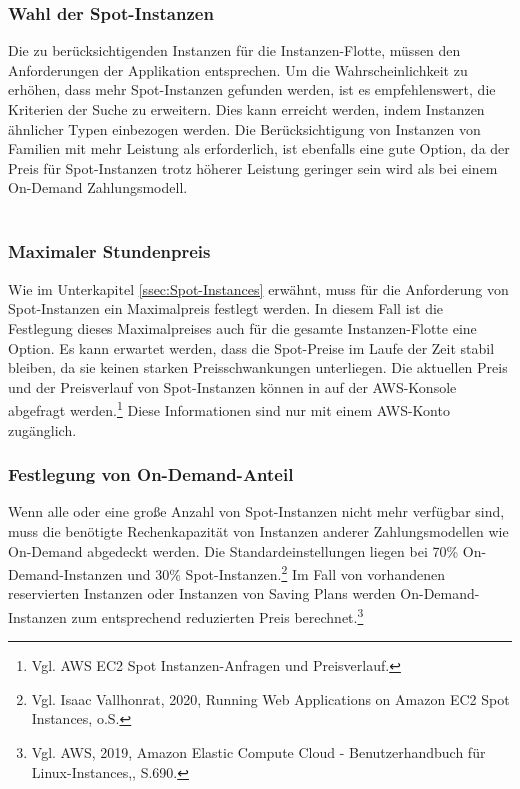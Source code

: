 \subsubsection*{Wahl der Spot-Instanzen}
Die zu berücksichtigenden Instanzen für die Instanzen-Flotte, müssen den Anforderungen der %
Applikation entsprechen. Um die Wahrscheinlichkeit zu erhöhen, dass mehr Spot-Instanzen gefunden werden, ist es empfehlenswert, die Kriterien der Suche zu erweitern. Dies kann erreicht werden, indem Instanzen ähnlicher Typen einbezogen werden. Die Berücksichtigung von Instanzen von Familien mit mehr Leistung als erforderlich, ist ebenfalls eine gute Option\cite{AMZ24}, da der Preis für Spot-Instanzen trotz höherer Leistung geringer sein wird als bei einem On-Demand Zahlungsmodell.
\\\\
\subsubsection*{Maximaler Stundenpreis}
Wie im Unterkapitel \ref{ssec:Spot-Instances} erwähnt, muss für die Anforderung von Spot-Instanzen ein Maximalpreis festlegt werden. In diesem Fall ist die Festlegung dieses Maximalpreises auch für die gesamte Instanzen-Flotte eine Option. Es kann erwartet werden, dass die Spot-Preise im Laufe der Zeit stabil bleiben, da sie keinen starken Preisschwankungen unterliegen. Die aktuellen Preis und der Preisverlauf von Spot-Instanzen können in auf der AWS-Konsole abgefragt werden.\footnote{Vgl. AWS EC2 Spot Instanzen-Anfragen und Preisverlauf\cite{AMZ25}.} Diese Informationen sind nur mit einem AWS-Konto zugänglich.

\subsubsection*{Festlegung von On-Demand-Anteil}
Wenn alle oder eine große Anzahl von Spot-Instanzen nicht mehr verfügbar sind, muss die benötigte Rechenkapazität von Instanzen anderer Zahlungsmodellen wie On-Demand abgedeckt werden. Die Standardeinstellungen liegen bei 70\% On-Demand-Instanzen und 30\% Spot-Instanzen.\footnote{Vgl. Isaac Vallhonrat, 2020, Running Web Applications on Amazon EC2 Spot Instances, o.S.\cite{AMZ24}} Im Fall von vorhandenen reservierten Instanzen oder Instanzen von Saving Plans werden On-Demand-Instanzen zum entsprechend reduzierten Preis berechnet.\footnote{Vgl. AWS, 2019, Amazon Elastic Compute Cloud - Benutzerhandbuch für Linux-Instances,, S.690\cite{AMZ26}.}

